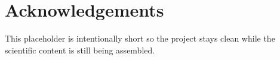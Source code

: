 \chapter*{Acknowledgements}


This placeholder is intentionally short so the project stays clean while the scientific content is still being assembled.


